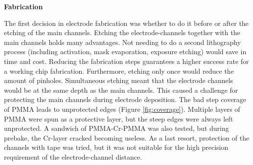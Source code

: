 \documentclass[final]{jyflluk}
\begin{document}
\begin{flushleft}\textbf{Fabrication} \end{flushleft}
The first decision in electrode fabrication was whether to do it before or after the etching of the main channels. Etching the electrode-channels together with the main channels holds many advantages. Not needing to do a second lithography process (including activation, mask evaporation, exposure etching) would save in time and cost. Reducing the fabrication steps guarantees a higher success rate for a working chip fabrication. Furthermore, etching only once would reduce the amount of pinholes. Simultaneous etching meant that the electrode channels would be at the same depth as the main channels. This caused a challenge for protecting the main channels during electrode deposition. The bad step coverage of PMMA leads to unprotected edges (Figure \ref{fig:coverage}). Multiple layers of PMMA were spun as a protective layer, but the steep edges were always left unprotected. A sandwich of PMMA-Cr-PMMA was also tested, but during prebake, the Cr-layer cracked becoming useless. As a last resort, protection of the channels with tape was tried, but it was not suitable for the high precision requirement of the electrode-channel distance.
\end{document}
